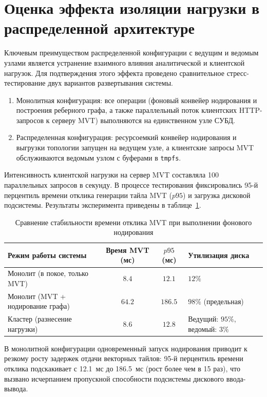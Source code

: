 \section{Оценка эффекта изоляции нагрузки в распределенной архитектуре}
\label{sec:isolation_benchmark}

Ключевым преимуществом распределенной конфигурации с ведущим и ведомым узлами является устранение взаимного влияния аналитической и клиентской нагрузок. Для подтверждения этого эффекта проведено сравнительное стресс-тестирование двух вариантов развертывания системы.
\begin{enumerate}
    \item Монолитная конфигурация: все операции (фоновый конвейер нодирования и построения реберного графа, а также параллельный поток клиентских HTTP-запросов к серверу MVT) выполняются на единственном узле СУБД.
    \item Распределенная конфигурация: ресурсоемкий конвейер нодирования и выгрузки топологии запущен на ведущем узле, а клиентские запросы MVT обслуживаются ведомым узлом с буферами в \texttt{tmpfs}.
\end{enumerate}

Интенсивность клиентской нагрузки на сервер MVT составляла 100 параллельных запросов в секунду. В процессе тестирования фиксировались 95-й перцентиль времени отклика генерации тайла MVT ($p95$) и загрузка дисковой подсистемы. Результаты эксперимента приведены в таблице~\ref{tab:isolation_perf}.

\begin{table}[htbp]
\small
\centering
\caption{Сравнение стабильности времени отклика MVT при выполнении фонового нодирования}
\label{tab:isolation_perf}
\begin{tabularx}{\linewidth}{|>{\hsize=1.15\hsize}X|c|c|>{\hsize=0.85\hsize}X|}
\hline
\textbf{Режим работы системы} & \textbf{Время MVT (мс)} & \textbf{$p95$ (мс)} & \textbf{Утилизация диска} \\ \hline
Монолит (в покое, только MVT) & $8.4$ & $12.1$ & $12\%$ \\ \hline
Монолит (MVT + нодирование графа) & $64.2$ & $186.5$ & $98\%$ (предельная) \\ \hline
Кластер (разнесение нагрузки) & $8.6$ & $12.8$ & Ведущий: $95\%$, ведомый: $3\%$ \\ \hline
\end{tabularx}
\end{table}

В монолитной конфигурации одновременный запуск нодирования приводит к резкому росту задержек отдачи векторных тайлов: 95-й перцентиль времени отклика подскакивает с 12.1~мс до 186.5~мс (рост более чем в 15 раз), что вызвано исчерпанием пропускной способности подсистемы дискового ввода-вывода.


